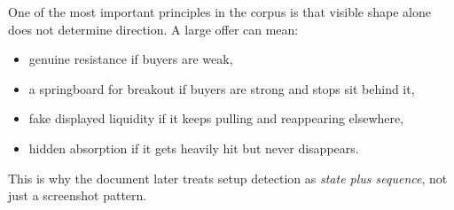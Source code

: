 One of the most important principles in the corpus is that visible shape alone does not determine direction. A large offer can mean:

\begin{itemize}
\item genuine resistance if buyers are weak,
\item a springboard for breakout if buyers are strong and stops sit behind it,
\item fake displayed liquidity if it keeps pulling and reappearing elsewhere,
\item hidden absorption if it gets heavily hit but never disappears.
\end{itemize}

This is why the document later treats setup detection as \emph{state plus sequence}, not just a screenshot pattern.

